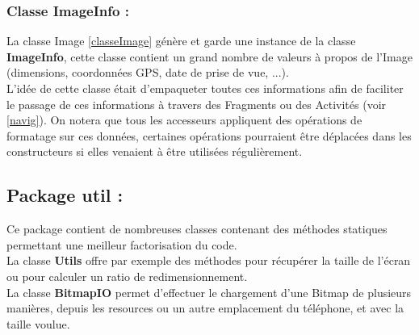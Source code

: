 \subsubsection{Classe \textbf{ImageInfo} :}
La classe Image \ref{classeImage} génère et garde une instance de la classe \textbf{ImageInfo}, cette classe contient un grand nombre de valeurs à propos de l'Image (dimensions, coordonnées GPS, date de prise de vue, ...).
\\
L'idée de cette classe était d'empaqueter toutes ces informations afin de faciliter le passage de ces informations à travers des Fragments ou des Activités (voir \ref{navig}). On notera que tous les accesseurs appliquent des opérations de formatage sur ces données, certaines opérations pourraient être déplacées dans les constructeurs si elles venaient à être utilisées régulièrement.

\subsection{Package \textbf{util} :}
Ce package contient de nombreuses classes contenant des méthodes statiques permettant une meilleur factorisation du code.
\\
La classe \textbf{Utils} offre par exemple des méthodes pour récupérer la taille de l'écran ou pour calculer un ratio de redimensionnement.
\\
La classe \textbf{BitmapIO} permet d'effectuer le chargement d'une Bitmap de plusieurs manières, depuis les resources ou un autre emplacement du téléphone, et avec la taille voulue.
